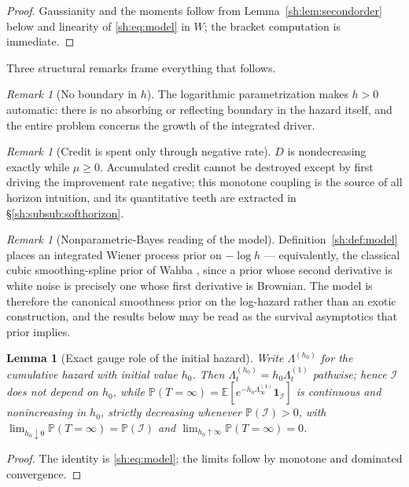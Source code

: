 \documentclass[11pt]{article}
\numberwithin{equation}{section}
\theoremstyle{plain}
\newtheorem{lemma}[theorem]{Lemma}
\theoremstyle{definition}
\theoremstyle{remark}
\newtheorem{remark}[theorem]{Remark}
\newcommand{\E}{\mathbb{E}}
\newcommand{\PP}{\mathbb{P}}
\newcommand{\one}{\mathbf{1}}
\newcommand{\Imm}{\mathcal{I}}
\begin{document}
\begin{proof}
Gaussianity and the moments follow from
Lemma~\ref{sh:lem:secondorder} below and linearity of
\eqref{sh:eq:model} in $W$; the bracket computation is immediate.
\end{proof}

Three structural remarks frame everything that follows.

\begin{remark}[No boundary in $h$]\label{sh:rem:noboundary}
The logarithmic parametrization makes $h>0$ automatic: there is no absorbing
or reflecting boundary in the hazard itself, and the entire problem concerns
the growth of the integrated driver.
\end{remark}

\begin{remark}[Credit is spent only through negative rate]\label{sh:rem:monot}
$D$ is nondecreasing exactly while $\mu\ge0$. Accumulated credit cannot be
destroyed except by first driving the improvement rate negative; this
monotone coupling is the source of all horizon intuition, and its
quantitative teeth are extracted in \S\ref{sh:subsub:softhorizon}.
\end{remark}

\begin{remark}[Nonparametric-Bayes reading of the model]\label{sh:rem:iwp}
Definition~\ref{sh:def:model} places an integrated Wiener process prior on
$-\log h$ --- equivalently, the classical cubic smoothing-spline prior of
Wahba \cite{Wah78}, since a prior whose second derivative is white noise
is precisely one whose first derivative is Brownian. The model is
therefore the canonical smoothness prior on the log-hazard rather than an
exotic construction, and the results below may be read as the survival
asymptotics that prior implies.
\end{remark}

\begin{lemma}[Exact gauge role of the initial hazard]\label{sh:lem:hgauge}
Write $\Lambda^{(h_0)}$ for the cumulative hazard with initial value $h_0$.
Then $\Lambda^{(h_0)}_t=h_0\Lambda^{(1)}_t$ pathwise; hence $\Imm$ does not
depend on $h_0$, while
$\PP(T=\infty)=\E[e^{-h_0\Lambda^{(1)}_\infty}\one_\Imm]$ is continuous and
nonincreasing in $h_0$, strictly decreasing whenever $\PP(\Imm)>0$, with
$\lim_{h_0\downarrow0}\PP(T=\infty)=\PP(\Imm)$ and
$\lim_{h_0\uparrow\infty}\PP(T=\infty)=0$.
\end{lemma}

\begin{proof}
The identity is \eqref{sh:eq:model}; the limits follow by monotone and
dominated convergence.
\end{proof}
\end{document}
